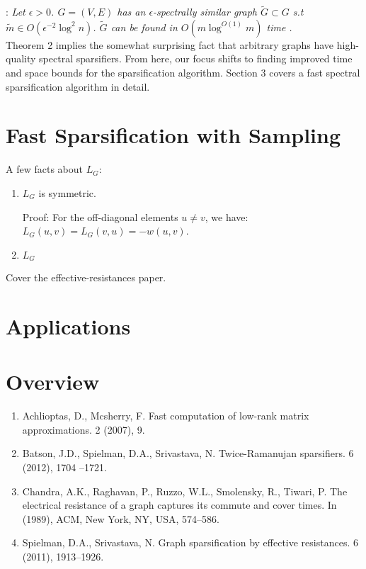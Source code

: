 \documentclass{article}
\begin{document}
\noindent
{}: \textit{Let $\epsilon > 0$. $G = (V,
E)$ has an $\epsilon$-spectrally similar graph $\tilde{G} \subset G$ s.t
$\tilde{m} \in O(\epsilon^{-2}\log^2 n)$. $\tilde{G}$ can be found in
$O(m\log^{O(1)}m)$ time \cite{SpielmanTeng} \cite{TheSurvey}.} \\

Theorem 2 implies the somewhat surprising fact that arbitrary graphs have
high-quality spectral sparsifiers. From here, our focus shifts to finding
improved time and space bounds for the sparsification algorithm. Section 3
covers a fast spectral sparsification algorithm in detail.

\section{Fast Sparsification with Sampling}

A few facts about $L_G$:
\begin{enumerate}[1.]
    \item $L_G$ is symmetric.

        Proof: For the off-diagonal elements $u \not= v$, we have: $L_G(u,
        v) = L_G(v, u) = -w(u, v)$.

    \item $L_G$ 
\end{enumerate}

Cover the effective-resistances paper.

\section{Applications}

\section{Overview}




\begin{enumerate}[1.]
    \item Achlioptas, D., Mcsherry, F. Fast computation of low-rank matrix
        approximations. 2 (2007), 9.

    \item Batson, J.D., Spielman, D.A., Srivastava, N.  Twice-Ramanujan
        sparsifiers. 6 (2012), 1704 –1721.

    \item Chandra, A.K., Raghavan, P., Ruzzo, W.L., Smolensky, R., Tiwari,
        P.  The electrical resistance of a graph captures its commute and
        cover times. In (1989), ACM, New York, NY, USA, 574–586.

    \item Spielman, D.A., Srivastava, N. Graph sparsification by effective
        resistances.  6 (2011), 1913–1926.
\end{enumerate}
\end{document}
